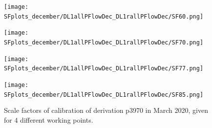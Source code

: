 \documentclass[letterpaper,12pt]{article}
\begin{document}
\iffalse
\begin{figure}[H]
\begin{minipage}[b]{.45\textwidth}
\centering
\texttt{[image: SFplots\_december/DL1allPFlowDec\_DL1rallPFlowDec/SF60.png]}
\end{minipage}\hfill
\begin{minipage}[b]{.45\textwidth}
\centering
\texttt{[image: SFplots\_december/DL1allPFlowDec\_DL1rallPFlowDec/SF70.png]}
\end{minipage}\hfill
\begin{minipage}[b]{.45\textwidth}
\centering
\texttt{[image: SFplots\_december/DL1allPFlowDec\_DL1rallPFlowDec/SF77.png]}
\end{minipage}\hfill
\begin{minipage}[b]{.45\textwidth}
\centering
\texttt{[image: SFplots\_december/DL1allPFlowDec\_DL1rallPFlowDec/SF85.png]}
\end{minipage}
\caption{Scale factors of calibration of derivation p3970 in March 2020, given for  4 different working points.} \label{fig:March}
\end{figure}
\end{document}
